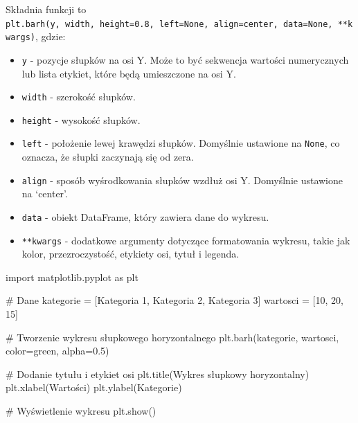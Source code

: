 \documentclass[
  polish,
  letterpaper,
  DIV=11,
  numbers=noendperiod]{scrreprt}
\newenvironment{Shaded}{\begin{snugshade}}{\end{snugshade}}
\newcommand{\CommentTok}[1]{\textcolor[rgb]{0.37,0.37,0.37}{#1}}
\newcommand{\DecValTok}[1]{\textcolor[rgb]{0.68,0.00,0.00}{#1}}
\newcommand{\FloatTok}[1]{\textcolor[rgb]{0.68,0.00,0.00}{#1}}
\newcommand{\ImportTok}[1]{\textcolor[rgb]{0.00,0.46,0.62}{#1}}
\newcommand{\NormalTok}[1]{\textcolor[rgb]{0.00,0.23,0.31}{#1}}
\newcommand{\OperatorTok}[1]{\textcolor[rgb]{0.37,0.37,0.37}{#1}}
\newcommand{\StringTok}[1]{\textcolor[rgb]{0.13,0.47,0.30}{#1}}
\providecommand{\tightlist}{%
  \setlength{\itemsep}{0pt}\setlength{\parskip}{0pt}}
\begin{document}
Składnia funkcji to
\texttt{plt.barh(y,\ width,\ height=0.8,\ left=None,\ align=\textquotesingle{}center\textquotesingle{},\ data=None,\ **kwargs)},
gdzie:

\begin{itemize}
\tightlist
\item
  \texttt{y} - pozycje słupków na osi Y. Może to być sekwencja wartości
  numerycznych lub lista etykiet, które będą umieszczone na osi Y.
\item
  \texttt{width} - szerokość słupków.
\item
  \texttt{height} - wysokość słupków.
\item
  \texttt{left} - położenie lewej krawędzi słupków. Domyślnie ustawione
  na \texttt{None}, co oznacza, że słupki zaczynają się od zera.
\item
  \texttt{align} - sposób wyśrodkowania słupków wzdłuż osi Y. Domyślnie
  ustawione na `center'.
\item
  \texttt{data} - obiekt DataFrame, który zawiera dane do wykresu.
\item
  \texttt{**kwargs} - dodatkowe argumenty dotyczące formatowania
  wykresu, takie jak kolor, przezroczystość, etykiety osi, tytuł i
  legenda.
\end{itemize}

\begin{Shaded}
\begin{Highlighting}[]
\ImportTok{import}\NormalTok{ matplotlib.pyplot }\ImportTok{as}\NormalTok{ plt}

\CommentTok{\# Dane}
\NormalTok{kategorie }\OperatorTok{=}\NormalTok{ [}\StringTok{\textquotesingle{}Kategoria 1\textquotesingle{}}\NormalTok{, }\StringTok{\textquotesingle{}Kategoria 2\textquotesingle{}}\NormalTok{, }\StringTok{\textquotesingle{}Kategoria 3\textquotesingle{}}\NormalTok{]}
\NormalTok{wartosci }\OperatorTok{=}\NormalTok{ [}\DecValTok{10}\NormalTok{, }\DecValTok{20}\NormalTok{, }\DecValTok{15}\NormalTok{]}

\CommentTok{\# Tworzenie wykresu słupkowego horyzontalnego}
\NormalTok{plt.barh(kategorie, wartosci, color}\OperatorTok{=}\StringTok{\textquotesingle{}green\textquotesingle{}}\NormalTok{, alpha}\OperatorTok{=}\FloatTok{0.5}\NormalTok{)}

\CommentTok{\# Dodanie tytułu i etykiet osi}
\NormalTok{plt.title(}\StringTok{\textquotesingle{}Wykres słupkowy horyzontalny\textquotesingle{}}\NormalTok{)}
\NormalTok{plt.xlabel(}\StringTok{\textquotesingle{}Wartości\textquotesingle{}}\NormalTok{)}
\NormalTok{plt.ylabel(}\StringTok{\textquotesingle{}Kategorie\textquotesingle{}}\NormalTok{)}

\CommentTok{\# Wyświetlenie wykresu}
\NormalTok{plt.show()}
\end{Highlighting}
\end{Shaded}
\end{document}
